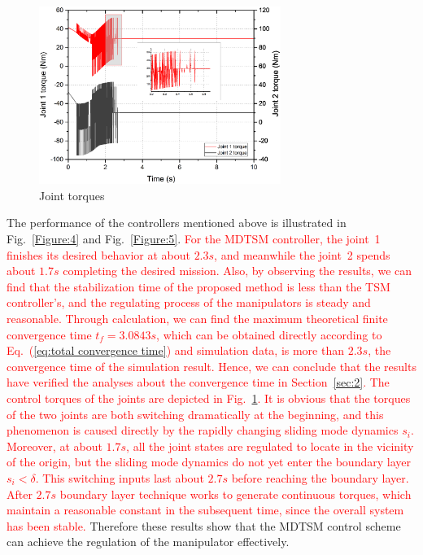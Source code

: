 \documentclass[3p]{elsarticle}
\theoremstyle{plain}
\theoremstyle{remark}
\begin{document}
\begin{figure}[http]
\centering
\includegraphics[width=0.7\textwidth]{paper3_torque.eps}
\caption{Joint torques}
\label{Figure:torque}
\end{figure}
The performance of the controllers mentioned above is illustrated in Fig.~\ref{Figure:4} and Fig.~\ref{Figure:5}. \textcolor{red}{For the MDTSM controller, the joint~1 finishes its desired behavior at about $2.3s$, and meanwhile the joint~2 spends about $1.7s$ completing the desired mission. Also, by observing the results, we can find that the stabilization time of the proposed method is less than the TSM controller's, and the regulating process of the manipulators is steady and reasonable. Through calculation, we can find the maximum theoretical finite convergence time $t_f=3.0843s$, which can be obtained directly according to Eq.~(\ref{eq:total convergence time}) and simulation data, is more than $2.3s$, the convergence time of the simulation result. Hence, we can conclude that the results have verified the analyses about the convergence time in Section~\ref{sec:2}.  The control torques of the joints are depicted in Fig.~\ref{Figure:torque}. It is obvious that the torques of the two joints are both switching dramatically at the beginning, and this phenomenon is caused directly by the rapidly changing sliding mode dynamics $s_i$. Moreover, at about $1.7s$, all the joint states are regulated to locate in the vicinity of the origin, but the sliding mode dynamics do not yet enter the boundary layer $s_i< \delta$. This switching inputs last about $2.7s$ before reaching the boundary layer. After $2.7s$ boundary layer technique works to generate continuous torques, which maintain a reasonable constant in the subsequent time, since the overall system has been stable.} Therefore these results show that the MDTSM control scheme can achieve the regulation of the manipulator effectively.
\end{document}
